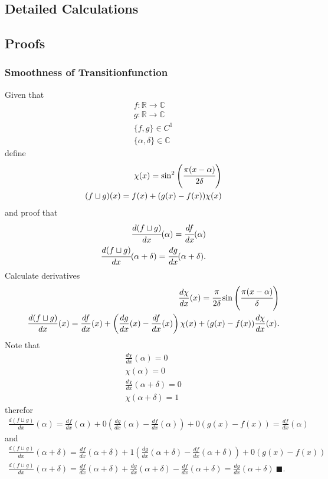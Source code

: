 \documentclass[11pt,DIV=10,final]{scrreprt} %
\newcommand{\deriv}[2]{%
  \frac{d#1}{d#2}
}
\begin{document}
\begin{appendix} %
%
\chapter{Detailed Calculations}
\section{Proofs}
\subsection{Smoothness of Transitionfunction}\label{proof:joint}
Given that
\begin{align}
  f: \mathbb{R} \rightarrow \mathbb{C} \\
  g: \mathbb{R} \rightarrow \mathbb{C} \\
  \{f, g\} \in C^{1} \\
  \{\alpha, \delta\} \in \mathbb{C}
\end{align}
define \hspace*{\fill}~\citep{hall2013quantum}
\begin{align}
  \chi(x) = \sin^{2}\left(\cfrac{\pi(x - \alpha)}{2\delta}\right) \\
  (f \sqcup g)(x) = f(x) + (g(x) - f(x)) \chi(x)
\end{align}
and proof that
\begin{align}
  \label{eq:deriv-f}
  \cfrac{d(f \sqcup g)}{dx}(\alpha) = \cfrac{df}{dx}(\alpha) \\
  \label{eq:deriv-g}
  \cfrac{d(f \sqcup g)}{dx}(\alpha + \delta) = \cfrac{dg}{dx}(\alpha + \delta).
\end{align}
Calculate derivatives
\begin{align}
  \deriv{\chi}{x}(x) = \cfrac{\pi}{2 \delta} \sin\left(\cfrac{\pi (x - \alpha)}{\delta}\right)\\
  \deriv{(f \sqcup g)}{x}(x) = \deriv{f}{x}(x) + \left(\deriv{g}{x}(x) - \deriv{f}{x}(x)\right)\chi(x) + (g(x) - f(x))\deriv{\chi}{x}(x).
\end{align}
Note that
\begin{align}
  \deriv{\chi}{x}(\alpha) = 0 \\
  \chi(\alpha) = 0 \\
  \deriv{\chi}{x}(\alpha + \delta) = 0 \\
  \chi(\alpha + \delta) = 1
\end{align}
therefor
\begin{align}
  \deriv{(f \sqcup g)}{x}(\alpha) = \deriv{f}{x}(\alpha) + 0 \left(\deriv{g}{x}(\alpha) - \deriv{f}{x}(\alpha)\right) + 0 (g(x) - f(x)) = \deriv{f}{x}(\alpha)
\end{align}
and
\begin{align}
  \deriv{(f \sqcup g)}{x}(\alpha + \delta) = \deriv{f}{x}(\alpha + \delta) + 1 \left(\deriv{g}{x}(\alpha + \delta) - \deriv{f}{x}(\alpha + \delta)\right) + 0 (g(x) - f(x)) \\
  \deriv{(f \sqcup g)}{x}(\alpha + \delta) = \deriv{f}{x}(\alpha + \delta) + \deriv{g}{x}(\alpha + \delta) - \deriv{f}{x}(\alpha + \delta) = \deriv{g}{x}(\alpha + \delta)~\blacksquare.
\end{align}


\end{appendix}
\end{document}
